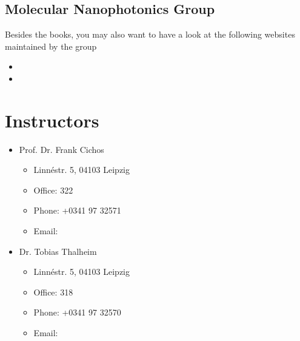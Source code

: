 \documentclass[letterpaper,10pt,english]{sphinxmanual}
\begin{document}
\section{Molecular Nanophotonics Group}
\label{\detokenize{course-info/resources:molecular-nanophotonics-group}}
\sphinxAtStartPar
Besides the books, you may also want to have a look at the following websites maintained by the group
\begin{itemize}
\item {} 
\sphinxAtStartPar
{}

\item {} 
\sphinxAtStartPar
{}

\end{itemize}


\chapter{Instructors}
\label{\detokenize{course-info/instructor:instructors}}\label{\detokenize{course-info/instructor::doc}}\begin{itemize}
\item {} 
\sphinxAtStartPar
Prof. Dr. Frank Cichos
\begin{itemize}
\item {} 
\sphinxAtStartPar
Linnéstr. 5, 04103 Leipzig

\item {} 
\sphinxAtStartPar
Office: 322

\item {} 
\sphinxAtStartPar
Phone: +0341 97 32571

\item {} 
\sphinxAtStartPar
Email: 

\end{itemize}

\end{itemize}

\begin{DUlineblock}{0em}
\item[] 
\end{DUlineblock}
\begin{itemize}
\item {} 
\sphinxAtStartPar
Dr. Tobias Thalheim
\begin{itemize}
\item {} 
\sphinxAtStartPar
Linnéstr. 5, 04103 Leipzig

\item {} 
\sphinxAtStartPar
Office: 318

\item {} 
\sphinxAtStartPar
Phone: +0341 97 32570

\item {} 
\sphinxAtStartPar
Email: 

\end{itemize}

\end{itemize}
\end{document}

